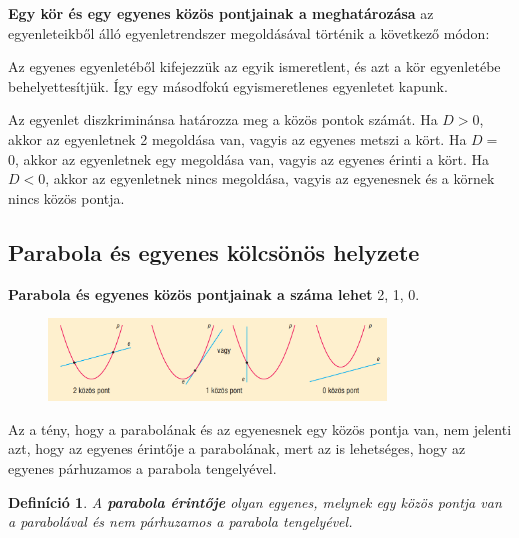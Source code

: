 \documentclass[12pt,a4paper]{article}
\newtheorem{definition}{Definíció} [section]
\begin{document}
\textbf{Egy kör és egy egyenes közös pontjainak a meghatározása} az egyenleteikből álló egyenletrendszer megoldásával történik a következő módon:

Az egyenes egyenletéből kifejezzük az egyik ismeretlent, és azt a kör egyenletébe behelyettesítjük. Így egy másodfokú egyismeretlenes egyenletet kapunk.

Az egyenlet diszkriminánsa határozza meg a közös pontok számát. Ha $D > 0$, akkor az egyenletnek 2 megoldása van, vagyis az egyenes metszi a kört. Ha $D = $0, akkor az egyenletnek egy megoldása van, vagyis az egyenes érinti a kört. Ha $D < 0$, akkor az egyenletnek nincs megoldása, vagyis az egyenesnek és a körnek nincs közös pontja.

\subsection{Parabola és egyenes kölcsönös helyzete}
\textbf{Parabola és egyenes közös pontjainak a száma lehet} 2, 1, 0.
\begin{figure}[h]
\centering
\includegraphics[width=0.8\textwidth]{parabola_egyenes_metszespont}
\end{figure}

Az a tény, hogy a parabolának és az egyenesnek egy közös pontja van, nem jelenti azt, hogy az egyenes érintője a parabolának, mert az is lehetséges, hogy az egyenes párhuzamos a parabola tengelyével.

\begin{definition}
A \textbf{parabola érintője} olyan egyenes, melynek egy közös pontja van a parabolával és nem párhuzamos a parabola tengelyével.
\end{definition}
\end{document}
